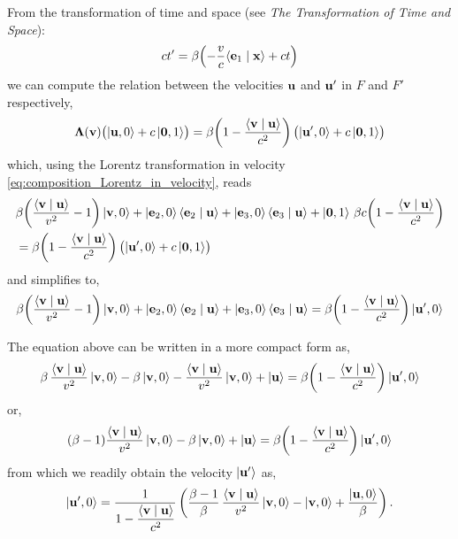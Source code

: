 \documentclass[12pt]{article}
\newcommand{\ip}[2]{\langle #1 \mid #2 \rangle}
\begin{document}
From the transformation of time and space (see \textit{The Transformation of Time and Space}):
\begin{equation}
  ct' = \beta\!\left(-\frac{v}{c}\ip{\vb{e}_1}{\vb{x}} + ct\right)
\end{equation}
we can compute the relation between the velocities $\vb{u}$ and $\vb{u}'$ in $F$ and $F'$
respectively,
\begin{equation}
  \boldsymbol{\Lambda}(\vb{v})\bigl(\ket{\vb{u},0} + c\ket{\vb{0},1}\bigr)
  = \beta\!\left(1 - \frac{\ip{\vb{v}}{\vb{u}}}{c^2}\right)
    \bigl(\ket{\vb{u}',0} + c\ket{\vb{0},1}\bigr)
\end{equation}
which, using the Lorentz transformation in velocity \eqref{eq:composition_Lorentz_in_velocity}, reads
\begin{equation}
  \begin{aligned}
    &\beta\!\left(\frac{\ip{\vb{v}}{\vb{u}}}{v^2} - 1\right)\ket{\vb{v},0}
    + \ket{\vb{e}_2,0}\ip{\vb{e}_2}{\vb{u}}
    + \ket{\vb{e}_3,0}\ip{\vb{e}_3}{\vb{u}}
    + \ket{\vb{0},1}\,\beta c\!\left(1 - \frac{\ip{\vb{v}}{\vb{u}}}{c^2}\right) \\
    &= \beta\!\left(1 - \frac{\ip{\vb{v}}{\vb{u}}}{c^2}\right)
       \bigl(\ket{\vb{u}',0} + c\ket{\vb{0},1}\bigr)
  \end{aligned}
\end{equation}
and simplifies to,
\begin{equation}
  \beta\!\left(\frac{\ip{\vb{v}}{\vb{u}}}{v^2} - 1\right)\ket{\vb{v},0}
  + \ket{\vb{e}_2,0}\ip{\vb{e}_2}{\vb{u}}
  + \ket{\vb{e}_3,0}\ip{\vb{e}_3}{\vb{u}}
  = \beta\!\left(1 - \frac{\ip{\vb{v}}{\vb{u}}}{c^2}\right)\ket{\vb{u}',0}
\end{equation}

The equation above can be written in a more compact form as,
\begin{equation}
  \beta\,\frac{\ip{\vb{v}}{\vb{u}}}{v^2}\ket{\vb{v},0}
  - \beta\ket{\vb{v},0}
  - \frac{\ip{\vb{v}}{\vb{u}}}{v^2}\ket{\vb{v},0}
  + \ket{\vb{u}}
  = \beta\!\left(1 - \frac{\ip{\vb{v}}{\vb{u}}}{c^2}\right)\ket{\vb{u}',0}
\end{equation}
or,
\begin{equation}
  (\beta - 1)\frac{\ip{\vb{v}}{\vb{u}}}{v^2}\ket{\vb{v},0}
  - \beta\ket{\vb{v},0}
  + \ket{\vb{u}}
  = \beta\!\left(1 - \frac{\ip{\vb{v}}{\vb{u}}}{c^2}\right)\ket{\vb{u}',0}
  \label{eq:velocities_relationship}
\end{equation}
from which we readily obtain the velocity $\ket{\vb{u}'}$ as,
\begin{equation}
  \ket{\vb{u}',0} = \frac{1}{\displaystyle 1 - \frac{\ip{\vb{v}}{\vb{u}}}{c^2}}
  \left(
    \frac{\beta-1}{\beta}\,\frac{\ip{\vb{v}}{\vb{u}}}{v^2}\ket{\vb{v},0}
    - \ket{\vb{v},0}
    + \frac{\ket{\vb{u},0}}{\beta}
  \right).
  \label{eq:inverse_velocity_composition}
\end{equation}
\end{document}
